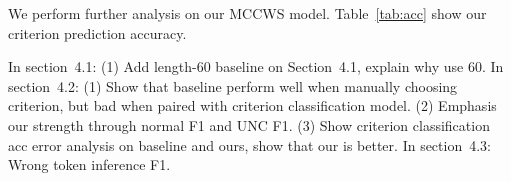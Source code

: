 \documentclass[11pt]{article}
\begin{document}
\begin{table}[t]
  \caption{Wrong token inference F1.}
  \label{tab:tkinf}
  \centering
\end{table}

We perform further analysis on our MCCWS model.
Table~\ref{tab:acc} show our criterion prediction accuracy.

In section~4.1:
(1) Add length-60 baseline on Section~4.1, explain why use 60.
In section~4.2:
(1) Show that baseline perform well when manually choosing criterion, but bad when paired with criterion classification model.
(2) Emphasis our strength through normal F1 and UNC F1.
(3) Show criterion classification acc error analysis on baseline and ours, show that our is better.
In section~4.3:
Wrong token inference F1.

\end{document}

